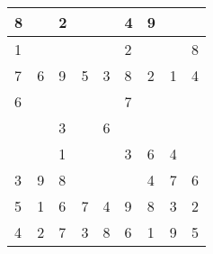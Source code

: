 \documentclass[12pt]{article}
\begin{document}
{\Large
\begin{center}
\begin{tabular}{|p{0.4in}|p{0.4in}|p{0.4in}|p{0.4in}|p{0.4in}|p{0.4in}|p{0.4in}|p{0.4in}|p{0.4in}|}
\hline
 8 &    &  2 &    &    &  4 &  9 &    &    \\ 
\hline
 1 &    &    &    &    &  2 &    &    &  8 \\ 
\hline
 7 &  6 &  9 &  5 &  3 &  8 &  2 &  1 &  4 \\ 
\hline
 6 &    &    &    &    &  7 &    &    &    \\ 
\hline
   &    &  3 &    &  6 &    &    &    &    \\ 
\hline
   &    &  1 &    &    &  3 &  6 &  4 &    \\ 
\hline
 3 &  9 &  8 &    &    &    &  4 &  7 &  6 \\ 
\hline
 5 &  1 &  6 &  7 &  4 &  9 &  8 &  3 &  2 \\ 
\hline
 4 &  2 &  7 &  3 &  8 &  6 &  1 &  9 &  5 \\ 
\hline
\end{tabular}
\end{center}

}
\end{document}
